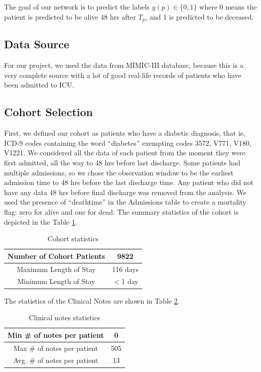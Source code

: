 \documentclass{sigkddExp}
\begin{document}
  The goal of our network is to predict the labels $\mathit {y(p) \in \{0,1\}}$ where 0 means the patient is predicted to be alive 48 hrs 
  after $\mathit {T_p}$, and 1 is predicted to be deceased.

  \subsection{Data Source}
  For our project, we  used the data from MIMIC-III database, because this is a very complete
  source with a lot of good real-life records of patients who have been admitted to ICU. 

\subsection{Cohort Selection}
First, we defined our cohort as patients who have a diabetic diagnosis, that is,
ICD-9 codes containing the word ``diabetes'' exempting codes 3572, V771, V180, V1221. 
We considered all the data of each patient from the moment they were first admitted, 
all the way to 48 hrs before last discharge. Some patients had multiple admissions, so 
we chose the observation window to be the earliest admission time to 48 hrs before the 
last discharge time. Any patient who did not have any data 48 hrs before final 
discharge was removed from the analysis. We used the presence of ``deathtime'' in the 
Admissions table to create a mortality flag: zero for alive and one for dead. 
The summary statistics of the cohort is depicted in the Table \ref{tab:cohort-stats}.

\begin{table}[h]
       \centering
       \caption{Cohort statistics}
       \label{tab:cohort-stats}
       \begin{tabular}{|c|c|} \hline
       Number of Cohort Patients&9822\\ \hline
       Maximum Length of Stay & 116 days\\ \hline
       Minimum Length of Stay& $\mathtt{<}$1 day\\ \hline
       \end{tabular}

\end{table}

The statistics of the Clinical Notes are shown in Table \ref{tab:notes-stats}.

\begin{table}
       \centering
       \caption{Clinical notes statistics}
       \label{tab:notes-stats}
       \begin{tabular}{|c|c|} \hline
       Min \# of notes per patient &0\\ \hline
       Max \# of notes per patient & 505 \\ \hline
       Avg. \# of notes per patient & 13\\ \hline
       \end{tabular}
\end{table}
\end{document}
